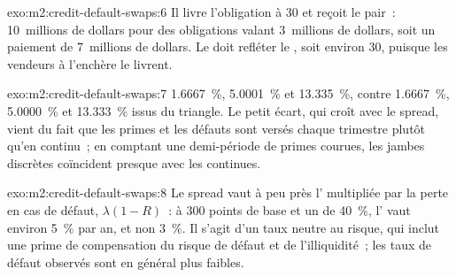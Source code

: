 \begin{solution}{exo:m2:credit-default-swaps:6}
Il livre l'obligation à 30 et reçoit le pair~: 10~millions de dollars pour des obligations valant
3~millions de dollars, soit un paiement de 7~millions de dollars. Le  doit refléter le
, soit environ 30, puisque les vendeurs à l'enchère le livrent.
\end{solution}

\begin{solution}{exo:m2:credit-default-swaps:7}
1.6667~\%, 5.0001~\% et 13.335~\%, contre 1.6667~\%, 5.0000~\% et 13.333~\% issus du
triangle. Le petit écart, qui croît avec le spread, vient du fait que les primes et les
défauts sont versés chaque trimestre plutôt qu'en continu~; en comptant une demi-période de
primes courues, les jambes discrètes coïncident presque avec les continues.
\end{solution}

\begin{solution}{exo:m2:credit-default-swaps:8}
Le spread vaut à peu près l' multipliée par la perte en cas de défaut, $\lambda(1-R)$~: à
300 points de base et un  de 40~\%, l' vaut environ 5~\% par an, et non 3~\%. Il
s'agit d'un taux neutre au risque, qui inclut une prime de compensation du risque de défaut et
de l'illiquidité~; les taux de défaut observés sont en général plus faibles.
\end{solution}

